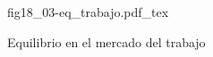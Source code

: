 \begin{figure}[h]
\centering
\def\svgwidth{0.5\textwidth}
{fig18_03-eq_trabajo.pdf_tex}
\caption{Equilibrio en el mercado del trabajo}
\label{fig18_03-eq_trabajo}
\end{figure}